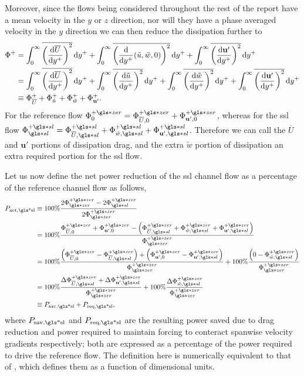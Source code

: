 Moreover, since the flows being considered throughout the rest of the report have a mean velocity in the $y$ or $z$ direction, nor will they have a phase averaged velocity in the $y$ direction we can then reduce the dissipation further to 
\begin{align}
	\Phi ^{+} &=\int_{0}^{\infty}  \overline{\left( \dv{\overline{U}}{y\ensuremath{^{+}}}  \right) ^2}\dd{y\ensuremath{^{+}}}+\int_{0}^{\infty}  \overline{\left( \dv{y\ensuremath{^{+}}}(\tilde{u},\tilde{w},0)  \right) ^2} \dd{y\ensuremath{^{+}}} + \int_{0}^{\infty}  \overline{\left(\dv{\mathbf{u'} }{y\ensuremath{^{+}}}\right) ^2} \dd{y\ensuremath{^{+}}}\\
	&=\int_{0}^{\infty}  \overline{\left( \dv{\overline{U}}{y\ensuremath{^{+}}}  \right) ^2}\dd{y\ensuremath{^{+}}}+\int_{0}^{\infty}  \overline{\left( \dv{\tilde{u}}{y\ensuremath{^{+}}}  \right) ^2} \dd{y\ensuremath{^{+}}} +\int_{0}^{\infty}  \overline{\left( \dv{\tilde{w}}{y\ensuremath{^{+}}}  \right) ^2} \dd{y\ensuremath{^{+}}} + \int_{0}^{\infty}  \overline{\left(\dv{\mathbf{u'} }{y\ensuremath{^{+}}}\right) ^2} \dd{y\ensuremath{^{+}}}\\
	&\equiv \Phi_{\overline{U}}^{+} + \Phi _{\tilde{u}}^{+} + \Phi _{\tilde{w}}^{+} + \Phi _{\mathbf{u'} }^{+}
.\end{align}
For the reference flow $\Phi _{0}\pz=\Phi _{\overline{U},0}\pz+\Phi _{\mathbf{u'} ,0}\pz$, whereas for the \gls{ssl} flow $\Phi \ssl\ps=\Phi _{\overline{U},\gls*{sl}}\ps + \Phi _{\tilde{w},\gls*{sl}}\ps + \Phi _{\mathbf{u'},\gls*{sl} }\ps$. Therefore we can call the $\overline{U}$ and $\mathbf{u'} $ portions of dissipation drag, and the extra $\tilde{w}$ portion of dissipation an extra required portion for the \gls{ssl} flow.

Let us now define the net power reduction of the \gls{ssl} channel flow as a percentage of the reference channel flow as follows,
\begin{align}
	P_\text{net,\gls*{sl}} &\equiv 100\% \frac{ 2\Phi \zz\pz-2\Phi \ssl\pz }{2\Phi \zz\pz} \\
			       &= 100\% \frac{\Phi _{\overline{U},0}\pz+\Phi _{\mathbf{u'} ,0}\pz-\left(\Phi _{\overline{U},\gls*{sl}}\pz + \Phi _{\tilde{w},\gls*{sl}}\pz + \Phi _{\mathbf{u'},\gls*{sl} }\pz\right)}{\Phi \zz\pz} \\
			       &= 100\% \frac{\left(\Phi _{\overline{U},0}\pz-\Phi _{\overline{U},\gls*{sl}}\pz\right)+\left(\Phi _{\mathbf{u'} ,0}\pz - \Phi _{\mathbf{u'},\gls*{sl} }\pz\right)}{\Phi \zz\pz}+100\%\frac{\left(0- \Phi _{\tilde{w},\gls*{sl}}\pz\right) }{\Phi \zz\pz} \\
			       &= 100\% \frac{\Delta\Phi _{\overline{U},\gls*{sl}}\pz+\Delta \Phi _{\mathbf{u'},\gls*{sl} }\pz}{\Phi \zz\pz}+100\%\frac{ \Delta\Phi _{\tilde{w},\gls*{sl}}\pz }{\Phi \zz\pz} \\
			       &\equiv P_\text{sav,\gls*{sl}} +  P_\text{req,\gls*{sl}} \label{eq:psavpreqsl}
,\end{align}
where $P_\text{sav,\gls*{sl}} $ and $P_\text{req,\gls*{sl}} $ are the resulting power saved due to drag reduction and power required to maintain forcing to conteract spanwise velocity gradients respectively; both are expressed as a percentage of the power required to drive the reference flow. The definition here is numerically equivalent to that of \textcite{viotti2009}, which defines them as a function of dimensional units.

